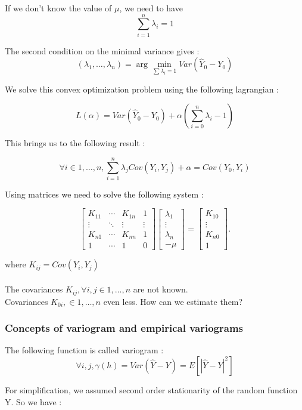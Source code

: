\documentclass[hidelinks,12pt]{article}
\begin{document}
If we don't know the value of $\mu$, we need to have $$\sum_{i=1}^{n}\lambda_i=1$$

The second condition on the minimal variance gives : 
$$ (\lambda_1,\ldots,\lambda_n)= \arg\min_{\sum \lambda_i=1} Var(\hat{Y}_0-Y_0)$$

We solve this convex optimization problem using the following lagrangian :

$$L(\alpha)=Var(\hat{Y}_0-Y_0)+\alpha(\sum_{i=0}^{n}\lambda_i-1)$$

This brings us to the following result :

$$\forall i \in {1,\ldots, n}, \sum_{i=1}^{n}\lambda_j Cov(Y_i,Y_j)+ \alpha = Cov(Y_0,Y_i)$$

Using matrices we need to solve the following system :

$$
\begin{bmatrix}
K_{11}& \cdots  & K_{1n} & 1\\ \vdots & \ddots & \vdots & \vdots \\ K_{n1} & \cdots  & K_{nn} & 1 \\ 1 & \cdots & 1 & 0 
\end{bmatrix} 
\begin{bmatrix}
\lambda_1 \\ \vdots \\ \lambda_n \\ - \mu 
\end{bmatrix} = 
\begin{bmatrix} K_{10} \\ \vdots \\ K_{n0} \\ 1
\end{bmatrix}.$$

where $K_{ij}=Cov(Y_i,Y_j)$
\\\\
The covariances $K_{ij}, \forall i,j\in {1,\ldots,n}$ are not known.
\\
Covariances $K_{0i}, \in {1,\ldots,n}$ even less. How can we estimate them?

\subsubsection{Concepts of variogram and empirical variograms}

The following function is called variogram : $$\forall i,j, \gamma(h)=Var(\hat{Y}-Y)=E[|\hat{Y}-Y|^2]$$

For simplification, we assumed second order stationarity of the random function Y. So we have :
\end{document}
